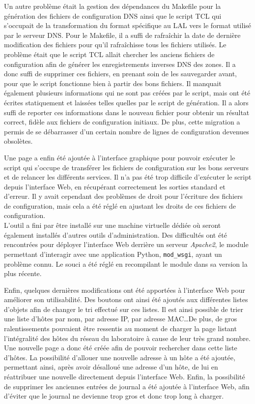 \documentclass[12pt,a4paper,twoside]{report}
\begin{document}
Un autre problème était la gestion des dépendances du Makefile pour la
génération des fichiers de configuration DNS ainsi que le script TCL qui
s’occupait de la transformation du format spécifique au LAL vers le format
utilisé par le serveur DNS. Pour le Makefile, il a suffi de rafraîchir la
date de dernière modification des fichiers pour qu’il rafraîchisse tous les
fichiers utilisés. Le problème était que le script TCL allait chercher les
anciens fichiers de configuration afin de générer les enregistrements inverses
DNS des zones. Il a donc suffi de supprimer ces fichiers, en prenant soin de
les sauvegarder avant, pour que le script fonctionne bien à partir des bons
fichiers. Il manquait également plusieurs informations qui ne sont pas créées
par le script, mais ont été écrites statiquement et laissées telles quelles par
le script de génération. Il a alors suffi de reporter ces informations dans le
nouveau fichier pour obtenir un résultat correct, fidèle aux fichiers de
configuration initiaux. De plus, cette migration a permis de se débarrasser
d’un certain nombre de lignes de configuration devenues obsolètes.

Une page a enfin été ajoutée à l’interface graphique pour pouvoir exécuter le
script qui s’occupe de transférer les fichiers de configuration sur les bons
serveurs et de relancer les différents services. Il n’a pas été trop difficile
d’exécuter le script depuis l’interface Web, en récupérant correctement les
sorties standard et d’erreur. Il y avait cependant des problèmes de droit pour
l’écriture des fichiers de configuration, mais cela a été réglé en ajustant les
droits de ces fichiers de configuration.\\

L’outil a fini par être installé sur une machine virtuelle dédiée où seront
également installés d’autres outils d’administration. Des difficultés ont été
rencontrées pour déployer l’interface Web derrière un serveur \emph{Apache2},
le module permettant d’interagir avec une application Python, \verb+mod_wsgi+,
ayant un problème connu. Le souci a été réglé en recompilant le module dans
sa version la plus récente.

Enfin, quelques dernières modifications ont été apportées à l’interface Web
pour améliorer son utilisabilité. Des boutons ont ainsi été ajoutés aux
différentes listes d’objets afin de changer le tri effectué sur ces listes. Il
est ainsi possible de trier une liste d’hôtes par nom, par adresse IP, par
adresse MAC\dots De plus, de gros ralentissements pouvaient être ressentis au
moment de charger la page listant l’intégralité des hôtes du réseau du
laboratoire à cause de leur très grand nombre. Une nouvelle page a donc été
créée afin de pouvoir rechercher dans cette liste d’hôtes. La possibilité
d’allouer une nouvelle adresse à un hôte a été ajoutée, permettant ainsi, après
avoir désalloué une adresse d’un hôte, de lui en réattribuer une nouvelle
directement depuis l’interface Web. Enfin, la possibilité de supprimer les
anciennes entrées de journal a été ajoutée à l’interface Web, afin d’éviter que
le journal ne devienne trop gros et donc trop long à charger.
\end{document}

